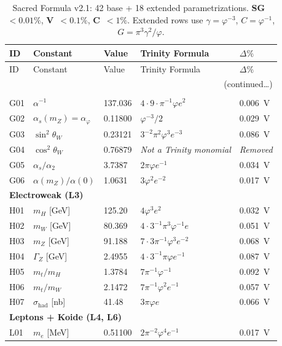\documentclass[12pt,a4paper]{article}
\newcommand{\ph}{\varphi}
\newcommand{\aph}{\alpha_{\varphi}}
\begin{document}
\begin{longtable}{@{}lp{2.6cm}lp{4.6cm}l@{}}
\caption{Sacred Formula v2.1: 42 base + 18 extended parametrizations.
\textbf{SG}~$<0.01\%$, \textbf{V}~$<0.1\%$, \textbf{C}~$<1\%$.
Extended rows use $\gamma=\ph^{-3}$, $C=\ph^{-1}$, $G=\pi^3\gamma^2/\ph$.}
\label{tab:catalog}\\
\toprule
ID & Constant & Value & Trinity Formula & $\Delta\%$ \\
\midrule\endfirsthead
\toprule ID & Constant & Value & Trinity Formula & $\Delta\%$ \\\midrule\endhead
\midrule\multicolumn{5}{r}{\small(continued\ldots)}\\\endfoot
\bottomrule\endlastfoot
\multicolumn{5}{l}{\textcolor{trinityGreen}{\textbf{Gauge (L2)}}}\\
G01 & $\alpha^{-1}$ & 137.036 & $4{\cdot}9{\cdot}\pi^{-1}\ph e^2$ & 0.006~V \\
G02 & $\alpha_s(m_Z)=\aph$ & 0.11800 & $\ph^{-3}/2$ & 0.029~V \\
G03 & $\sin^2\theta_W$ & 0.23121 & $3^{-2}\pi^2\ph^3 e^{-3}$ & 0.086~V \\
G04 & $\cos^2\theta_W$ & 0.76879 & \textit{Not a Trinity monomial} & \textit{Removed} \\
G05 & $\alpha_s/\alpha_2$ & 3.7387 & $2\pi\ph e^{-1}$ & 0.034~V \\
G06 & $\alpha(m_Z)/\alpha(0)$ & 1.0631 & $3\ph^2 e^{-2}$ & 0.017~V \\
\midrule
\multicolumn{5}{l}{\textcolor{trinityBlue}{\textbf{Electroweak (L3)}}}\\
H01 & $m_H$ [GeV] & 125.20 & $4\ph^3 e^2$ & 0.032~V \\
H02 & $m_W$ [GeV] & 80.369 & $4{\cdot}3^{-1}\pi^3\ph^{-1}e$ & 0.051~V \\
H03 & $m_Z$ [GeV] & 91.188 & $7{\cdot}3\pi^{-1}\ph^3 e^{-2}$ & 0.068~V \\
H04 & $\Gamma_Z$ [GeV] & 2.4955 & $4{\cdot}3^{-1}\pi\ph e^{-1}$ & 0.087~V \\
H05 & $m_t/m_H$ & 1.3784 & $7\pi^{-1}\ph^{-1}$ & 0.092~V \\
H06 & $m_t/m_W$ & 2.1472 & $7\pi^{-1}\ph^2 e^{-1}$ & 0.057~V \\
H07 & $\sigma_{\mathrm{had}}$ [nb] & 41.48 & $3\pi\ph e$ & 0.066~V \\
\midrule
\multicolumn{5}{l}{\textcolor{trinityPurple}{\textbf{Leptons + Koide (L4, L6)}}}\\
L01 & $m_e$ [MeV] & 0.51100 & $2\pi^{-2}\ph^4 e^{-1}$ & 0.017~V \\

\end{longtable}
\end{document}
